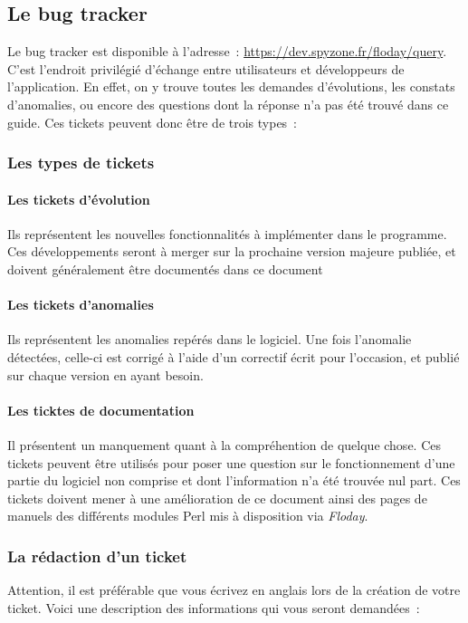\subsection{Le bug tracker}
\label{sec:contribution_bt}

Le bug tracker est disponible à l'adresse~: \url{https://dev.spyzone.fr/floday/query}.
C'est l'endroit privilégié d'échange entre utilisateurs et développeurs de l'application.
En effet, on y trouve toutes les demandes d'évolutions, les constats d'anomalies, ou encore des questions dont la réponse n'a pas été trouvé dans ce guide.
Ces tickets peuvent donc être de trois types~:

\subsubsection{Les types de tickets}
\paragraph{Les tickets d'évolution} Ils représentent les nouvelles fonctionnalités à implémenter dans le programme. Ces développements seront à merger sur la prochaine version majeure publiée, et doivent généralement être documentés dans ce document
\paragraph{Les tickets d'anomalies} Ils représentent les anomalies repérés dans le logiciel. Une fois l'anomalie détectées, celle-ci est corrigé à l'aide d'un correctif écrit pour l'occasion, et publié sur chaque version en ayant besoin.
\paragraph{Les ticktes de documentation} Il présentent un manquement quant à la compréhention de quelque chose. Ces tickets peuvent être utilisés pour poser une question sur le fonctionnement d'une partie du logiciel non comprise et dont l'information n'a été trouvée nul part. Ces tickets doivent mener à une amélioration de ce document ainsi des pages de manuels des différents modules Perl mis à disposition via \emph{Floday}.

\subsubsection{La rédaction d'un ticket}
Attention, il est préférable que vous écrivez en anglais lors de la création de votre ticket.
Voici une description des informations qui vous seront demandées~:
\newline

